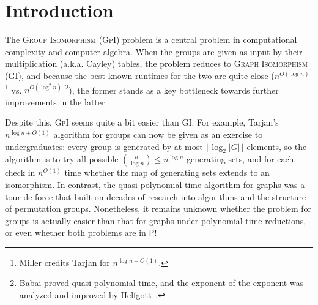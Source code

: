 \documentclass{article}
\newcommand{\algprobm}[1]{\textsc{#1}\xspace}
\newcommand{\betacc}[1]{\ifthenelse{\equal{#1}{1}}{\exists^{\log n}}{\exists^{\log^{#1}n}}} %
\newcommand*{\ComplexityClass}[1]{\ensuremath{\mathsf{#1}}\xspace}
\newcommand*{\NP}{\ComplexityClass{NP}}
\renewcommand{\P}{\ComplexityClass{P}}
\newcommand*{\LogSpace}{\ComplexityClass{L}}
\newcommand{\ACz}{\ComplexityClass{AC^0}}
\newcommand{\qACz}{\ComplexityClass{quasiAC^0}}
\newcommand{\FOLL}{\ComplexityClass{FOLL}}
\begin{document}
\begin{abstract}
\begin{itemize}
\item \algprobm{Quasigroup Isomorphism} belongs to $\betacc{2}\ACz(\mathsf{TIMESPACE}(\text{polylog}(n), \log(n))) \subseteq \qACz$. As a consequence of this result and previously known $\ACz$ reductions, this implies the same upper bound for the \algprobm{Isomorphism Problems} for: Steiner triple systems, pseudo-STS graphs, \algprobm{Latin Square Isotopy}, Latin square graphs, and Steiner $(t,t+1)$-designs. 
This improves upon the previous upper bound for these problems, which was $\betacc{2}\LogSpace \cap \betacc{2}\FOLL \subseteq \mathsf{quasiFOLL}$ (Chattopadhyay, Tor\'an, \& Wagner, \emph{ibid.}; Levet, \textit{Australas. J. Combin.} 2023).

\item  As a strong contrast, we show that MGS for arbitrary magmas is \NP-complete.
\end{itemize}

Our results suggest that understanding the constant-depth circuit complexity may be key to resolving the complexity of problems concerning (quasi)groups in the multiplication table model.
\end{abstract}



\setcounter{page}{1}

\section{Introduction}
The \algprobm{Group Isomorphism} (\algprobm{GpI}) problem is a central problem in computational complexity and computer algebra. When the groups are given as input by their multiplication (a.k.a. Cayley) tables, the problem reduces to \algprobm{Graph Isomorphism} (\algprobm{GI}), and because the best-known runtimes for the two are quite close ($n^{O(\log n)}$ \cite{MillerTarjan}\footnote{Miller \cite{MillerTarjan} credits Tarjan for $n^{\log n + O(1)}$.} vs. $n^{O(\log^2 n)}$ \cite{BabaiGraphIso}\footnote{Babai \cite{BabaiGraphIso} proved quasi-polynomial time, and the exponent of the exponent was analyzed and improved by Helfgott~\cite{HelgottGIAnalysis}.}), the former stands as a key bottleneck towards further improvements in the latter. 

Despite this, \algprobm{GpI} seems quite a bit easier than \algprobm{GI}. For example, Tarjan's $n^{\log n + O(1)}$ algorithm for groups \cite{MillerTarjan} can now be given as an exercise to undergraduates: every group is generated by at most $\lfloor \log_2 |G| \rfloor$ elements, so the algorithm is to try all possible $\binom{n}{\log n} \leq n^{\log n}$ generating sets, and for each, check in $n^{O(1)}$ time whether the map of generating sets extends to an isomorphism. In contrast, the quasi-polynomial time algorithm for graphs was a tour de force that built on decades of research into algorithms and the structure of permutation groups. Nonetheless, it remains unknown whether the problem for groups is actually easier than that for graphs under polynomial-time reductions, or even whether both problems are in $\P$!
\end{document}
